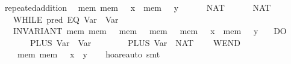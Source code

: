 \documentclass{llncs}
\begin{document}
\begin{isabellebody}
\isanewline
{}\isamarkupfalse%
\ repeated{}addition{}\isanewline
\ \ {}{}mem{}\ mem\ {}\ {}\ x\ {}\ mem\ {}\ {}\ y{}\ {}\isanewline
\ \ \ {}\ {}{}\ NAT\ {}{}\isanewline
\ \ \ {}\ {}{}\ NAT\ {}{}\isanewline
\ \ \ {}WHILE\ {}{}pred\ {}EQ\ {}Var\ {}{}\ {}Var\ {}{}{}{}\isanewline
\ \ \ INVARIANT\ {}mem{}\ mem\ {}\ {}\ mem\ {}\ {}\ mem\ {}\ {}\ mem\ {}\ {}\ x\ {}\ mem\ {}\ {}\ y{}\isanewline
\ \ \ DO\isanewline
\ \ \ \ \ {}\ {}{}\ PLUS\ {}Var\ {}{}\ {}Var\ {}{}{}\isanewline
\ \ \ \ \ {}\ {}{}\ PLUS\ {}Var\ {}{}\ {}NAT\ {}{}\isanewline
\ \ \ WEND{}\isanewline
\ \ \ {}\ {}mem{}\ mem\ {}\ {}\ {}x\ {}\ y{}{}{}\isanewline
%
\isadelimproof
\ \ %
\endisadelimproof
%
\isatagproof
{}\isamarkupfalse%
\ hoare{}auto\ smt%
\endisatagproof
\end{isabellebody}
\end{document}
